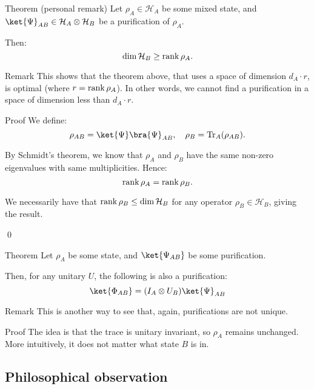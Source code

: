 \documentclass[a4paper]{article}
\begin{document}
\begin{parag}{Theorem (personal remark)}
    Let $\rho_A \in \mathcal{H}_A$ be some mixed state, and $\ket{\Psi}_{AB} \in \mathcal{H}_A \otimes \mathcal{H}_B$ be a purification of $\rho_A$.

    Then: 
    \[\dim \mathcal{H}_B \geq \operatorname{rank} \rho_A.\]

    \begin{subparag}{Remark}
        This shows that the theorem above, that uses a space of dimension $d_A \cdot r$, is optimal (where $r = \operatorname{rank} \rho_A$). In other words, we cannot find a purification in a space of dimension less than $d_A \cdot r$.
    \end{subparag}

    \begin{subparag}{Proof}
        We define: 
        \[\rho_{AB} = \ket{\Psi}\bra{\Psi}_{AB}, \mathspace \rho_B = \Tr_A\left(\rho_{AB}\right).\]

        By Schmidt's theorem, we know that $\rho_A$ and $\rho_B$ have the same non-zero eigenvalues with same multiplicities. Hence: 
        \[\operatorname{rank} \rho_A = \operatorname{rank} \rho_B.\]

        We necessarily have that $\operatorname{rank} \rho_B \leq \dim \mathcal{H}_B$ for any operator $\rho_B \in \mathcal{H}_B$, giving the result.

        \qed
    \end{subparag}
\end{parag}

\begin{parag}{Theorem}
    Let $\rho_A$ be some state, and $\ket{\Psi_{AB}}$ be some purification.

    Then, for any unitary $U$, the following is also a purification: 
    \[\ket{\Phi_{AB}} = \left(I_A \otimes U_B\right) \ket{\Psi}_{AB}\]

    \begin{subparag}{Remark}
        This is another way to see that, again, purifications are not unique.
    \end{subparag}

    \begin{subparag}{Proof}
        The idea is that the trace is unitary invariant, so $\rho_A$ remains unchanged. More intuitively, it does not matter what state $B$ is in.
    \end{subparag}
\end{parag}

\subsection{Philosophical observation}
\end{document}
